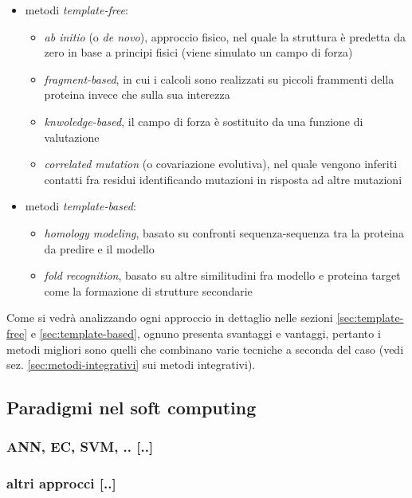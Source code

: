 \begin{itemize}
	\item metodi \textit{template-free}:
	
	\begin{itemize}
		\item \textit{ab initio} (o \textit{de novo}), approccio fisico, nel quale la struttura è predetta da zero in base a principi fisici (viene simulato un campo di forza)
		\item \textit{fragment-based}, in cui i calcoli sono realizzati su piccoli frammenti della proteina invece che sulla sua interezza
		\item \textit{knwoledge-based}, il campo di forza è sostituito da una funzione di valutazione
		\item \textit{correlated mutation} (o covariazione evolutiva), nel quale vengono inferiti contatti fra residui identificando mutazioni in risposta ad altre mutazioni
	\end{itemize}
	
	\item metodi \textit{template-based}:
	\begin{itemize}
		\item \textit{homology modeling}, basato su confronti sequenza-sequenza tra la proteina da predire e il modello
		\item \textit{fold recognition}, basato su altre similitudini fra modello e proteina target come la formazione di strutture secondarie
	\end{itemize}

\end{itemize}

Come si vedrà analizzando ogni approccio in dettaglio nelle sezioni \ref{sec:template-free} e \ref{sec:template-based}, ognuno presenta svantaggi e vantaggi, pertanto i metodi migliori sono quelli che combinano varie tecniche a seconda del caso (vedi sez. \ref{sec:metodi-integrativi} sui metodi integrativi).

\subsection{Paradigmi nel soft computing}
\subsubsection{ANN, EC, SVM, .. [..]}
\subsubsection{altri approcci [..]}

